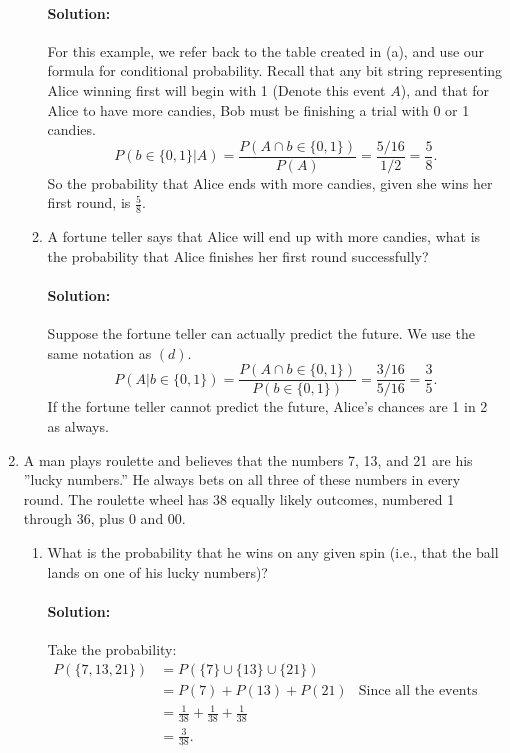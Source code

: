 \documentclass{article}
\begin{document}
\begin{enumerate}
\begin{enumerate}
        \paragraph{Solution: } For this example, we refer back to the table created in (a), and use our formula for conditional probability. Recall that any bit string representing Alice winning first will begin with 1 (Denote this event $A$), and that for Alice to have more candies, Bob must be finishing a trial with 0 or 1 candies.
        \[
        P(b\in \{0,1\} |A)=\frac{P(A\cap b\in \{0,1\} )}{P(A)}=\frac{5/16}{1 /2}=\frac{5}{8}
        .\] 
        So the probability that Alice ends with more candies, given she wins her first round, is $\frac{5}{8}$.
    \item A fortune teller says that Alice will end up with more candies, what is the probability that Alice finishes her first round successfully?
        \paragraph{Solution: }Suppose the fortune teller can actually predict the future. We use the same notation as $(d)$.
         \[
        P(A|b\in \{0,1\} )=\frac{P(A\cap b\in \{0,1\} )}{P(b\in \{0,1\} )}=\frac{3/16}{5 /16}=\frac{3}{5}
        .\] 
        If the fortune teller cannot predict the future, Alice's chances are 1 in 2 as always.

\end{enumerate}
\item  A man plays roulette and believes that the numbers 7, 13, and 21 are his ”lucky numbers.” He always bets on all three of these numbers in every round. The roulette wheel has 38 equally likely outcomes, numbered 1 through 36, plus 0 and 00.
\begin{enumerate}
    \item What is the probability that he wins on any given spin (i.e., that the ball lands on one of his lucky numbers)?
        \paragraph{Solution: } Take the probability:
        \begin{align*}
            P(\{7,13,21\})&= P(\{7\} \cup \{13\} \cup \{21\} ) \\
            &= P(7)+P(13)+P(21)&\text{Since all the events are disjoint} \\
            &= \frac{1}{38}+ \frac{1}{38}+\frac{1}{38}\\
            &=\frac{3}{38}
        .\end{align*}


\end{enumerate}
\end{enumerate}
\end{document}
